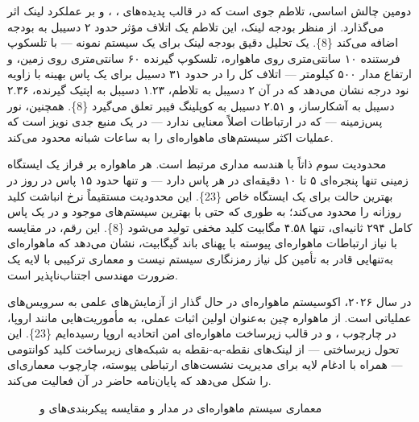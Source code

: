 \documentclass[a4paper,14pt]{extreport}
\begin{document}
دومین چالش اساسی، تلاطم جوی  است که در قالب پدیده‌های ، ، و  بر عملکرد لینک اثر می‌گذارد. از منظر بودجه لینک، این تلاطم یک اتلاف مؤثر حدود ۲ دسیبل به بودجه اضافه می‌کند \{8\}. یک تحلیل دقیق بودجه لینک برای یک سیستم نمونه --- با تلسکوپ فرستنده ۱۰ سانتی‌متری روی ماهواره، تلسکوپ گیرنده ۶۰ سانتی‌متری روی زمین، و ارتفاع مدار ۵۰۰ کیلومتر --- اتلاف کل را در حدود ۳۱ دسیبل برای یک پاس بهینه با زاویه  نود درجه نشان می‌دهد که در آن ۲ دسیبل به تلاطم، ۱.۲۳ دسیبل به اپتیک گیرنده، ۲.۳۶ دسیبل به آشکارساز، و ۲.۵۱ دسیبل به کوپلینگ فیبر تعلق می‌گیرد \{8\}. همچنین، نور پس‌زمینه --- که در ارتباطات  اصلاً معنایی ندارد --- در  یک منبع جدی نویز است که عملیات اکثر سیستم‌های  ماهواره‌ای را به ساعات شبانه محدود می‌کند.

محدودیت سوم ذاتاً با هندسه مداری  مرتبط است. هر ماهواره  بر فراز یک ایستگاه زمینی تنها پنجره‌ای ۵ تا ۱۰ دقیقه‌ای در هر پاس دارد --- و تنها حدود ۱۵ پاس در روز در بهترین حالت برای یک ایستگاه خاص \{23\}. این محدودیت مستقیماً نرخ انباشت کلید روزانه را محدود می‌کند؛ به طوری که حتی با بهترین سیستم‌های موجود و در یک پاس کامل ۲۹۴ ثانیه‌ای، تنها ۴.۵۸ مگابیت کلید مخفی تولید می‌شود \{8\}. این رقم، در مقایسه با نیاز ارتباطات ماهواره‌ای پیوسته با پهنای باند گیگابیت، نشان می‌دهد که  ماهواره‌ای به‌تنهایی قادر به تأمین کل نیاز رمزنگاری سیستم نیست و معماری ترکیبی با لایه  یک ضرورت مهندسی اجتناب‌ناپذیر است.

در سال ۲۰۲۶، اکوسیستم  ماهواره‌ای در حال گذار از آزمایش‌های علمی به سرویس‌های عملیاتی است. از ماهواره  چین به‌عنوان اولین اثبات عملی، به مأموریت‌هایی مانند  اروپا،  در چارچوب ، و  در قالب زیرساخت ماهواره‌ای امن اتحادیه اروپا رسیده‌ایم \{23\}. این تحول زیرساختی --- از لینک‌های نقطه-به-نقطه به شبکه‌های زیرساخت کلید کوانتومی  --- همراه با ادغام لایه  برای مدیریت نشست‌های ارتباطی پیوسته، چارچوب معماری‌ای را شکل می‌دهد که پایان‌نامه حاضر در آن فعالیت می‌کند.

\begin{figure}[H]
\centering
{}
\caption{معماری سیستم  ماهواره‌ای در مدار  و مقایسه پیکربندی‌های  و }
\label{fig:2-5}
\end{figure}
\end{document}
